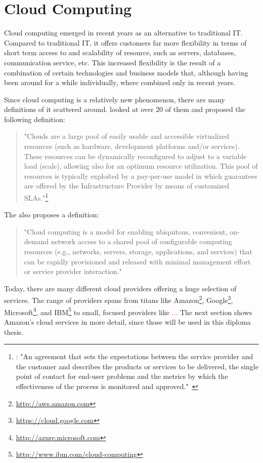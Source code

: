 \section{Cloud Computing}

Cloud computing emerged in recent years as an alternative to traditional IT.
Compared to traditional IT, it offers customers far more flexibility in terms of short term access to and scalability of resource, such as servers, databases, communication service, etc.
This increased flexibility is the result of a combination of certain technologies and business models that, although having been around for a while individually, where combined only in recent years.

Since cloud computing is a relatively new phenomenon, there are many definitions of it scattered around. \citeauthor{cloud:def:towards} looked at over 20 of them and proposed the following definition:

\begin{quote}
	"Clouds are a large pool of easily usable and accessible virtualized resources (such as hardware, development platforms and/or services). These resources can be dynamically reconfigured to adjust to a variable load (scale), allowing also for an optimum resource utilization. This pool of resources is typically exploited by a pay-per-use model in which guarantees are offered by the Infrastructure Provider by means of customized SLAs."\footnote{: "An agreement that sets the expectations between the service provider and the customer and describes the products or services to be delivered, the single point of contact for end-user problems and the metrics by which the effectiveness of the process is monitored and approved."~\autocite{def:sla}}~\autocite{cloud:def:towards}
\end{quote}

The  also proposes a definition:

\begin{quote}
	"Cloud computing is a model for enabling ubiquitous, convenient, on-demand network access to a shared pool of configurable computing resources (e.g., networks, servers, storage, applications, and services) that can be rapidly provisioned and released with minimal management effort or service provider interaction."~\autocite{cloud:def:nist}
\end{quote}

Today, there are many different cloud providers offering a huge selection of services.
The range of providers spans from titans like Amazon\footnote{\url{http://aws.amazon.com}}, Google\footnote{\url{https://cloud.google.com}}, Microsoft\footnote{\url{http://azure.microsoft.com}}, and IBM\footnote{\url{http://www.ibm.com/cloud-computing}} to small, focused providers like \textcolor{red}{...}
The next section shows Amazon's cloud services in more detail, since those will be used in this diploma thesis.

